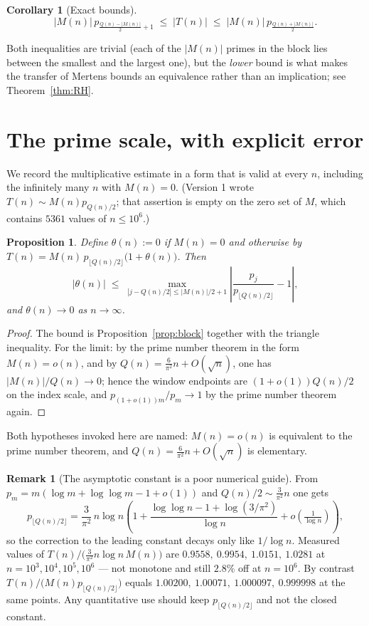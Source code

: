 \documentclass[11pt]{amsart}
\newtheorem{proposition}[theorem]{Proposition}
\newtheorem{corollary}[theorem]{Corollary}
\theoremstyle{definition}
\newtheorem{remark}[theorem]{Remark}
\newcommand{\Mert}{M}
\newcommand{\Sq}{Q}
\begin{document}
\begin{corollary}[Exact bounds]\label{cor:bounds}
\[
|\Mert(n)|\,p_{\frac{\Sq(n)-|\Mert(n)|}{2}+1}
\;\le\;
|T(n)|
\;\le\;
|\Mert(n)|\,p_{\frac{\Sq(n)+|\Mert(n)|}{2}} .
\]
\end{corollary}

Both inequalities are trivial (each of the $|\Mert(n)|$ primes in the block lies
between the smallest and the largest one), but the \emph{lower} bound is what
makes the transfer of Mertens bounds an equivalence rather than an implication;
see Theorem~\ref{thm:RH}.

\section{The prime scale, with explicit error}

We record the multiplicative estimate in a form that is valid at every $n$,
including the infinitely many $n$ with $\Mert(n)=0$. (Version 1 wrote
$T(n)\sim \Mert(n)p_{\Sq(n)/2}$; that assertion is empty on the zero set of
$\Mert$, which contains $5361$ values of $n\le10^{6}$.)

\begin{proposition}\label{prop:scale}
Define $\theta(n):=0$ if $\Mert(n)=0$ and otherwise by
$T(n)=\Mert(n)\,p_{\lfloor \Sq(n)/2\rfloor}\bigl(1+\theta(n)\bigr)$. Then
\[
|\theta(n)|\;\le\;
\max_{|j-\Sq(n)/2|\le |\Mert(n)|/2+1}
\left|\frac{p_j}{p_{\lfloor \Sq(n)/2\rfloor}}-1\right| ,
\]
and $\theta(n)\to0$ as $n\to\infty$.
\end{proposition}

\begin{proof}
The bound is Proposition~\ref{prop:block} together with the triangle
inequality. For the limit: by the prime number theorem in the form
$\Mert(n)=o(n)$, and by $\Sq(n)=\tfrac{6}{\pi^2}n+O(\sqrt n)$, one has
$|\Mert(n)|/\Sq(n)\to0$; hence the window endpoints are
$(1+o(1))\Sq(n)/2$ on the index scale, and $p_{(1+o(1))m}/p_m\to1$ by the prime
number theorem again.
\end{proof}

Both hypotheses invoked here are named: $\Mert(n)=o(n)$ is equivalent to the
prime number theorem, and $\Sq(n)=\tfrac6{\pi^2}n+O(\sqrt n)$ is elementary.

\begin{remark}[The asymptotic constant is a poor numerical guide]
From $p_m=m(\log m+\log\log m-1+o(1))$ and $\Sq(n)/2\sim \tfrac3{\pi^2}n$ one
gets
\[
p_{\lfloor \Sq(n)/2\rfloor}
=\frac{3}{\pi^2}\,n\log n\left(1+\frac{\log\log n-1+\log(3/\pi^2)}{\log n}+o\!\left(\tfrac1{\log n}\right)\right),
\]
so the correction to the leading constant decays only like $1/\log n$. Measured
values of $T(n)\big/\bigl(\tfrac3{\pi^2}n\log n\,\Mert(n)\bigr)$ are
$0.9558,\ 0.9954,\ 1.0151,\ 1.0281$ at $n=10^3,10^4,10^5,10^6$ --- not monotone
and still $2.8\%$ off at $n=10^6$. By contrast
$T(n)/\bigl(\Mert(n)p_{\lfloor \Sq(n)/2\rfloor}\bigr)$ equals
$1.00200,\ 1.00071,\ 1.000097,\ 0.999998$ at the same points. Any quantitative
use should keep $p_{\lfloor \Sq(n)/2\rfloor}$ and not the closed constant.
\end{remark}
\end{document}
